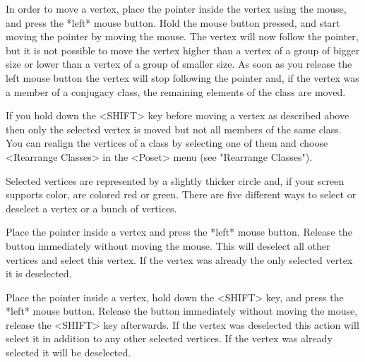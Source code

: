 




In order to move a vertex, place the  pointer inside the vertex using the
mouse, and press the *left* mouse button.  Hold the mouse button pressed,
and start moving  the pointer by moving  the mouse.  The  vertex will now
follow the pointer, but it is not possible to move the vertex higher than
a vertex  of a group of bigger size  
or lower than a vertex of a group of smaller
size.
As soon as you release the left mouse
button the vertex will stop following the pointer  and, if the vertex was
a member of a  conjugacy class, the remaining elements  of the class  are
moved.

If you hold  down  the <SHIFT> key before  moving  a vertex as  described
above then  only the selected vertex is moved but not all members of the
same class. You can realign the vertices of a class by selecting one of
them and choose <Rearrange Classes> in the <Poset> menu 
(see "Rearrange Classes").


Selected vertices are  represented by a slightly  thicker circle and,  if
your screen  supports color, are colored red   or green.  There  are five
different ways to select or deselect a vertex or a bunch of vertices.

Place the  pointer inside  a  vertex and press   the *left* mouse button.
Release   the button immediately   without  moving the  mouse.  This will
deselect all other vertices  and select this vertex.   If the vertex  was
already the only selected vertex it is deselected.

Place the  pointer inside a vertex, hold  down the <SHIFT> key, and press
the  *left* mouse button.   Release the button immediately without moving
the    mouse, release the   <SHIFT> key  afterwards.   If  the vertex was
deselected this action will  select it in  addition to any other selected
vertices. If the vertex was already selected it will be deselected.

